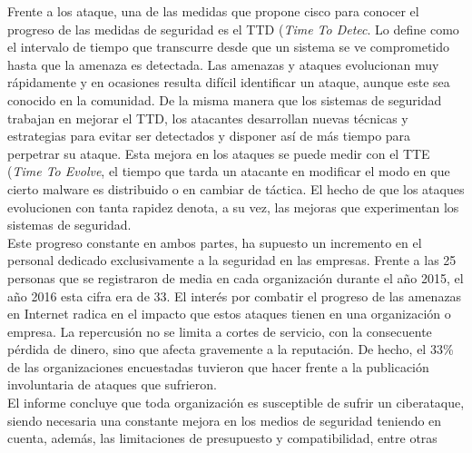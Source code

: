 Frente a los ataque, una de las medidas que propone cisco para conocer el progreso de las medidas de seguridad es el TTD (\textit{Time To Detec}. Lo define como el intervalo de tiempo que transcurre desde que un sistema se ve comprometido hasta que la amenaza es detectada. Las amenazas y ataques evolucionan muy rápidamente y en ocasiones resulta difícil identificar un ataque, aunque este sea conocido en la comunidad. De la misma manera que los sistemas de seguridad trabajan en mejorar el TTD, los atacantes desarrollan nuevas técnicas y estrategias para evitar ser detectados y disponer así de más tiempo  para perpetrar su ataque. Esta mejora en los ataques se puede medir con el TTE (\textit{Time To Evolve}, el tiempo que tarda un atacante en modificar el modo en que cierto malware es distribuido o en cambiar de táctica. El hecho de que los ataques evolucionen con tanta rapidez denota, a su vez, las mejoras que experimentan los sistemas de seguridad.\\
Este progreso constante en ambos partes, ha supuesto un incremento en el personal dedicado exclusivamente a la seguridad en las empresas. Frente a las 25 personas que se registraron de media en cada organización durante el año 2015, el año 2016 esta cifra era de 33. El interés por combatir el progreso de las amenazas en Internet radica en el impacto que estos ataques tienen en una organización o empresa. La repercusión no se limita a cortes de servicio, con la consecuente pérdida de dinero, sino que afecta gravemente a la reputación. De hecho, el 33\% de las organizaciones encuestadas tuvieron que hacer frente a la publicación involuntaria de ataques que sufrieron.\\
El informe concluye que toda organización es susceptible de sufrir un ciberataque, siendo necesaria una constante mejora en los medios de seguridad teniendo en cuenta, además, las limitaciones de presupuesto y compatibilidad, entre otras\cite{ciscoReport}


